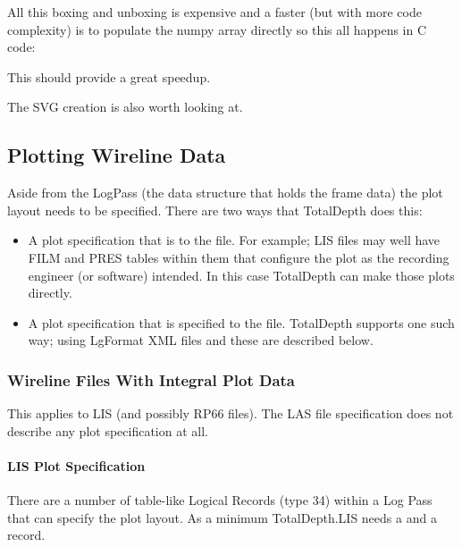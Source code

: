 \documentclass[letterpaper,10pt,english]{sphinxmanual}
\begin{document}
All this boxing and unboxing is expensive and a faster (but with more code complexity) is to populate the numpy array directly so this all happens in C code:

\begin{sphinxVerbatim}[commandchars=\\\{\}]
             
\end{sphinxVerbatim}

This should provide a great speedup.

The SVG creation is also worth looking at.
\label{\detokenize{tech/plotting:totaldepth-tech-plotting}}

\subsection{Plotting Wireline Data}
\label{\detokenize{tech/plotting::doc}}\label{\detokenize{tech/plotting:plotting-wireline-data}}
Aside from the LogPass (the data structure that holds the frame data) the plot layout needs to be specified. There are two ways that TotalDepth does this:
\begin{itemize}
\item {} 
A plot specification that is  to the file. For example; LIS files may well have FILM and PRES tables within them that configure the plot as the recording engineer (or software) intended. In this case TotalDepth can make those plots directly.

\item {} 
A plot specification that is specified  to the file. TotalDepth supports one such way; using LgFormat XML files and these are described below.

\end{itemize}


\subsubsection{Wireline Files With Integral Plot Data}
\label{\detokenize{tech/plotting:wireline-files-with-integral-plot-data}}
This applies to LIS (and possibly RP66 files). The LAS file specification does not describe any plot specification at all.


\paragraph{LIS Plot Specification}
\label{\detokenize{tech/plotting:lis-plot-specification}}
There are a number of table-like Logical Records (type 34) within a Log Pass that can specify the plot layout. As a minimum TotalDepth.LIS needs a  and a  record.
\end{document}
